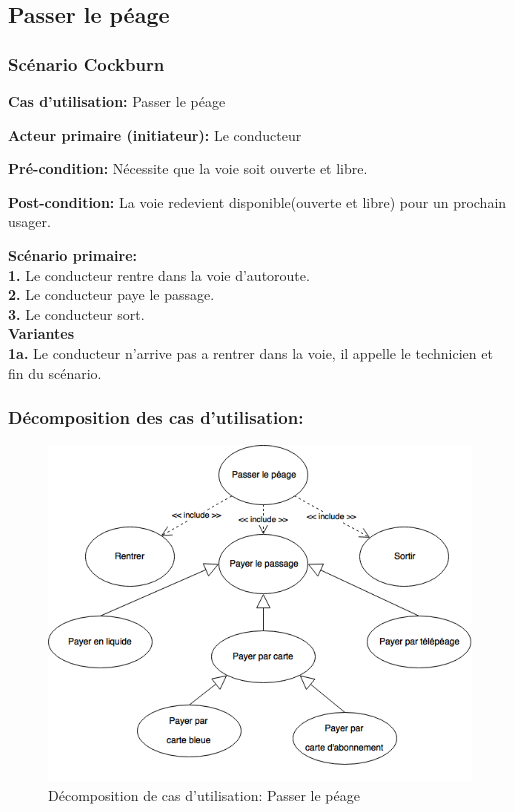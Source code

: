 \subsection{Passer le péage}
\subsubsection{Scénario Cockburn}
\textbf{Cas d'utilisation:} Passer le péage
    
\textbf{Acteur primaire (initiateur):} Le conducteur
    
\textbf{Pré-condition: } Nécessite que la voie soit ouverte et libre.
    
\textbf{Post-condition: }   La voie redevient disponible(ouverte et libre) pour un prochain usager.
    
\textbf{Scénario primaire: } \\
\textbf{1.} Le conducteur rentre dans la voie d’autoroute.%
 \\
\textbf{2.} Le conducteur paye le passage. %
\\
\textbf{3.} Le conducteur sort. %
\\
    
\textbf{Variantes}\\
\textbf{1a.}  Le conducteur n’arrive pas a rentrer dans la voie, il appelle le technicien et fin du scénario.\\
\newpage
\subsubsection{\textbf{Décomposition des cas d'utilisation:}}
\begin{figure}[h]
    \centering
    \includegraphics[scale=0.5]{02_Desenvolvimento/TD2/images/PasserLePeage.png}
    \caption{Décomposition de cas d'utilisation: Passer le péage}
\end{figure}
\newpage
